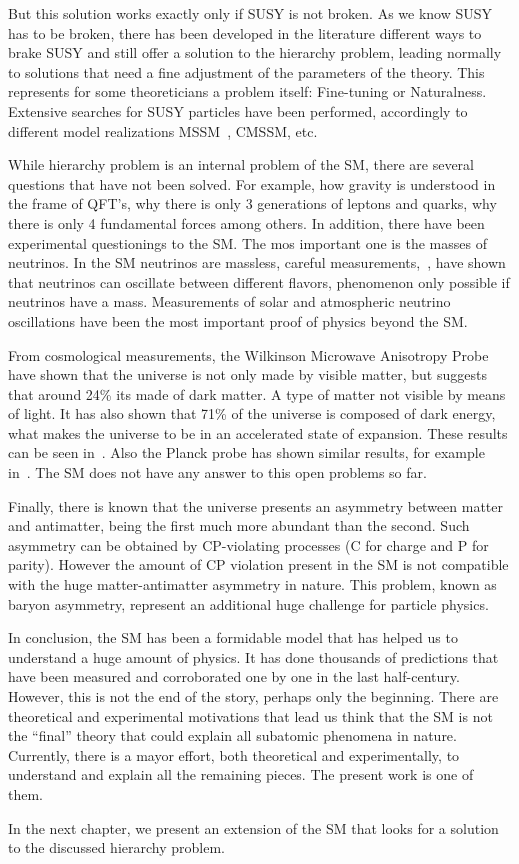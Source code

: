 But this solution works exactly only if SUSY is not broken. As we know SUSY has to be broken, there has been developed in the literature different ways to brake SUSY and still offer a solution to the hierarchy problem, leading normally to solutions that need a fine adjustment of the parameters of the theory. This represents for some theoreticians a problem itself: Fine-tuning or Naturalness. Extensive searches for SUSY particles have been performed, accordingly to different model realizations MSSM~\cite{Khachatryan:2014wca,Aad:2014vgg}, CMSSM, etc.

While hierarchy problem is an internal problem of the SM, there are several questions that have not been solved. For example, how gravity is understood in the frame of QFT's, why there is only 3 generations of leptons and quarks, why there is only 4 fundamental forces among others. In addition, there have been experimental questionings to the SM. The mos important one is the masses of neutrinos. In the SM neutrinos are massless, careful measurements,~\cite{Ashie:2004mr, Weinheimer:2013hya}, have shown that neutrinos can oscillate between different flavors, phenomenon only possible if neutrinos have a mass. Measurements of solar and atmospheric neutrino oscillations have been the most important proof of physics beyond the SM. 

From cosmological measurements, the Wilkinson Microwave Anisotropy Probe have shown that the universe is not only made by visible matter, but suggests that around 24\% its made of dark matter. A type of matter not visible by means of light. It has also shown that 71\% of the universe is composed of dark energy, what makes the universe to be in an accelerated state of expansion. These results can be seen in~\cite{2013ApJS..208...20B, 2013ApJS..208...19H}. Also the Planck probe has shown similar results, for example in~\cite{Planck:2015xua}. The SM does not have any answer to this open problems so far. 

Finally, there is known that the universe presents an asymmetry between matter and antimatter, being the first much more abundant than the second. Such asymmetry can be obtained by CP-violating processes (C for charge and P for parity). However the amount of CP violation present in the SM is not compatible with the huge matter-antimatter asymmetry in nature. This problem, known as baryon asymmetry, represent an additional huge challenge for particle physics. 

In conclusion, the SM has been a formidable model that has helped us to understand a huge amount of physics. It has done thousands of predictions that have been measured and corroborated one by one in the last half-century. However, this is not the end of the story, perhaps only the beginning. There are theoretical and experimental motivations that lead us think that the SM is not the ``final'' theory that could explain all subatomic phenomena in nature. Currently, there is a mayor effort, both theoretical and experimentally, to understand and explain all the remaining pieces. The present work is one of them.

In the next chapter, we present an extension of the SM that looks for a solution to the discussed hierarchy problem.